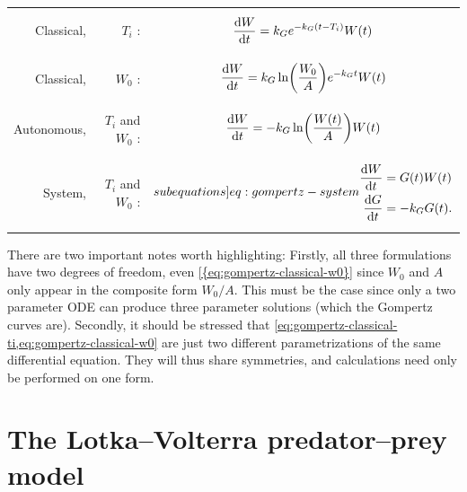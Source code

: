 \noindent
\begin{tabularx}{\linewidth}{rrM}
  Classical, & \(T_i\) :&
  \begin{minipage}{\linewidth}
    \begin{equation}
      \diff{W}{t} = k_G e^{-k_G (t - T_i)} W(t) \label{eq:gompertz-classical-ti}
    \end{equation}
  \end{minipage}\tabularnewline
  Classical, & \(W_0\) :&
  \begin{minipage}{\linewidth}
    \begin{equation}
      \diff{W}{t} = k_G \ln(\frac{W_0}{A})e^{-k_G t} W(t) \label{eq:gompertz-classical-w0}
    \end{equation}
  \end{minipage}\tabularnewline
  Autonomous, & \(T_i\) and \(W_0\) :&
  \begin{minipage}{\linewidth}
    \begin{equation}
      \diff{W}{t} = -k_G \ln(\frac{W(t)}{A}) W(t) \label{eq:gompertz-autonomous}
    \end{equation}
  \end{minipage}\tabularnewline
  System, & \(T_i\) and \(W_0\) :&
  \begin{minipage}{\linewidth}%
    {\begin{subequations} \label[subequations]{eq:gompertz-system}
      \begin{align}
        \diff{W}{t} &= G(t) W(t) \label{eq:gompertz-system-a}\\
        \diff{G}{t} &= -k_G G(t). \label{eq:gompertz-system-b}
      \end{align}
    \end{subequations}}%
  \end{minipage}
\end{tabularx}
There are two important notes worth highlighting:
Firstly, all three formulations have two degrees of freedom, even \cref{{eq:gompertz-classical-w0}} since \(W_0\) and \(A\) only appear in the composite form \(W_0 / A\).
This must be the case since only a two parameter ODE can produce three parameter solutions (which the Gompertz curves are).
Secondly, it should be stressed that \cref{eq:gompertz-classical-ti,eq:gompertz-classical-w0} are just two different parametrizations of the same differential equation.
They will thus share symmetries, and calculations need only be performed on one form.


\section{The Lotka--Volterra predator--prey model}

